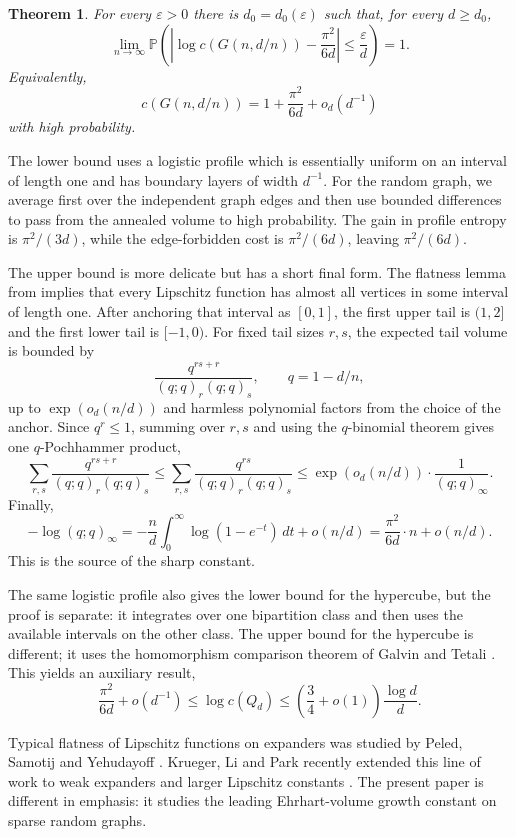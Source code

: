 \documentclass[11pt]{article}
\newtheorem{theorem}{Theorem}[section]
\theoremstyle{definition}
\newcommand{\PP}{\mathbb{P}}
\newcommand{\eps}{\varepsilon}
\begin{document}
\begin{theorem}\label{thm:main}
For every $\eps>0$ there is $d_0=d_0(\eps)$ such that, for every $d\ge d_0$,
\[
  \lim_{n\to\infty}\PP\left(
  \left|\log c(G(n,d/n))-\frac{\pi^2}{6d}\right|\le\frac{\eps}{d}
  \right)=1.
\]
Equivalently,
\[
  c(G(n,d/n))=1+\frac{\pi^2}{6d}+o_d(d^{-1})
\]
with high probability.
\end{theorem}

\smallskip
\noindent
The lower bound uses a logistic profile which is essentially uniform on an interval of length one and has boundary layers of width $d^{-1}$.  For the random graph, we average first over the independent graph edges and then use bounded differences to pass from the annealed volume to high probability.  The gain in profile entropy is $\pi^2/(3d)$, while the edge-forbidden cost is $\pi^2/(6d)$, leaving $\pi^2/(6d)$.

\bigskip
\noindent
The upper bound is more delicate but has a short final form.  The flatness lemma from \cite{KorskySaffatAiylam} implies that every Lipschitz function has almost all vertices in some interval of length one.  After anchoring that interval as $[0,1]$, the first upper tail is $(1,2]$ and the first lower tail is $[-1,0)$.  For fixed tail sizes $r,s$, the expected tail volume is bounded by
\[
  \frac{q^{rs+r}}{(q;q)_r(q;q)_s},
  \qquad q=1-d/n,
\]
up to $\exp(o_d(n/d))$ and harmless polynomial factors from the choice of the anchor.  Since $q^r\le1$, summing over $r,s$ and using the $q$-binomial theorem gives one $q$-Pochhammer product,
\[
  \sum_{r,s}\frac{q^{rs+r}}{(q;q)_r(q;q)_s}
  \le \sum_{r,s}\frac{q^{rs}}{(q;q)_r(q;q)_s}
  \le \exp(o_d(n/d))\cdot\frac1{(q;q)_\infty}.
\]
Finally,
\[
  -\log{(q;q)_\infty}
  =-\frac nd\int_0^\infty\log{(1-e^{-t})}\,dt+o(n/d)
  =\frac{\pi^2}{6d}\cdot n+o(n/d).
\]
This is the source of the sharp constant.

\bigskip
\noindent
The same logistic profile also gives the lower bound for the hypercube, but the proof is separate: it integrates over one bipartition class and then uses the available intervals on the other class.  The upper bound for the hypercube is different; it uses the homomorphism comparison theorem of Galvin and Tetali \cite{GalvinTetali}.  This yields an auxiliary result,
\[
  \frac{\pi^2}{6d}+o(d^{-1})\le \log c(Q_d)
  \le \left(\frac34+o(1)\right)\frac{\log d}{d}.
\]

\bigskip
\noindent
Typical flatness of Lipschitz functions on expanders was studied by Peled, Samotij and Yehudayoff \cite{PeledSamotijYehudayoff}.  Krueger, Li and Park recently extended this line of work to weak expanders and larger Lipschitz constants \cite{KruegerLiPark}.  The present paper is different in emphasis: it studies the leading Ehrhart-volume growth constant on sparse random graphs.
\end{document}
